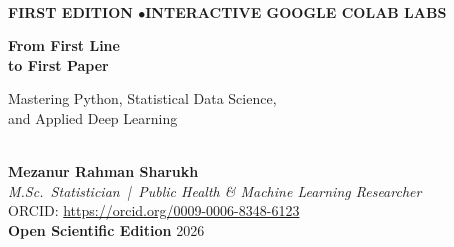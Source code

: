 {  %
  \thispagestyle{empty}
  \vspace*{1.0in}
  \noindent{\color{TealPrimary}\rule{\textwidth}{2.2pt}}\\[1.5em]
  {\small\bfseries\color{TealPrimary} FIRST EDITION \quad$\bullet$\quad INTERACTIVE GOOGLE COLAB LABS}\\[1.6em]
  {\fontsize{30}{42}\selectfont\bfseries\color{NavyAccent} From First Line\\to First Paper\par}
  \vspace{1.0em}
  {\Large\color{SlateNote} Mastering Python, Statistical Data Science,\\and Applied Deep Learning\par}
  \vspace{2.2em}
  \noindent{\color{AmberTrap}\rule{0.35\textwidth}{1.6pt}}\\[2.2em]
  {\Large\bfseries\color{NavyAccent} Mezanur Rahman Sharukh}\\[0.5em]
  {\normalsize\itshape\color{SlateNote} M.Sc.\ Statistician \,|\, Public Health \& Machine Learning Researcher}\\[0.35em]
  {\small\color{SlateNote} ORCID: \url{https://orcid.org/0009-0006-8348-6123}}
  \vfill
  \noindent{\color{TealPrimary}\rule{\textwidth}{0.8pt}}\\[0.7em]
  {\small\color{SlateNote} \textbf{Open Scientific Edition} \hfill 2026}
  \clearpage

}
